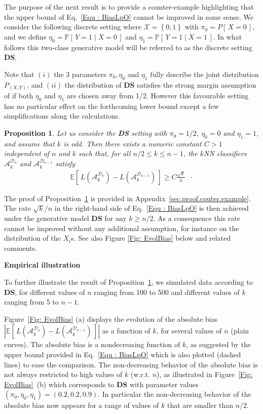 \documentclass[twoside,11pt]{article}
\numberwithin{equation}{section}
\newtheorem{prop}{Proposition}[section]
\newcommand{\1}{\mathds{1}}%
\newcommand{\paren}[1]{\left( #1 \right)}
\newcommand{\croch}[1]{\left[\, #1 \,\right]}
\newcommand{\acc}[1]{\left\{ #1 \right\}}
\newcommand{\E}{\mathbb{E}}
\renewcommand{\P}{\mathbb{P}}
\newcommand{\D}{\mathcal{D}}
\newcommand{\Dn}{\mathcal{D}_n}
\newcommand{\A}{\mathcal{A}}
\numberwithin{equation}{section}
\theoremstyle{plain}
\begin{document}
The purpose of the next result is to provide a counter-example highlighting that the upper bound of Eq.~\eqref{Equ : BiasLpO} cannot be improved in some sense. We consider the following discrete setting where $\mathcal{X}=\acc{0,1}$ with $\pi_0 = P\croch{X=0}$, and we define $\eta_0 = \P\croch{ Y=1 \mid X=0}$ and $\eta_1 = \P\croch{ Y=1 \mid X=1}$. In what follows this two-class generative model will be referred to as the discrete setting \textbf{DS}.

Note that $(i)$ the 3 parameters $\pi_0, \eta_0$ and $\eta_1$ fully describe the joint distribution $P_{(X,Y)}$, and $(ii)$ the distribution of \textbf{DS} satisfies the strong margin assumption of \cite{MassNedelec_2006} if both $\eta_0$ and $\eta_1$ are chosen away from 1/2. However this favourable setting has no particular effect on the forthcoming lower bound except a few simplifications along the calculations.


\begin{prop}\label{res.counter.example.bias}
Let us consider the \textbf{DS} setting with $\pi_0 = 1/2$, $\eta_0 = 0$ and $\eta_1 = 1$, and assume that $k$ is odd.
Then there exists a numeric constant $C>1$ independent of $n$ and $k$ such that, for all $n/2 \leq k \leq n-1$, the $k$NN classifiers $\A_k^{\Dn}$ and $\A_k^{\D_{n-1}}$ satisfy
\begin{align*}
\E\croch{ L\paren{\A_k^{\Dn}} - L\paren{\A_k^{\D_{n-1}}}  } \geq C \frac{\sqrt{k}}{n} \enspace\cdot
\end{align*}
\end{prop}
%
The proof of Proposition~\ref{res.counter.example.bias} is provided in Appendix~\ref{sec.proof.couter.example}.
%
The rate $\sqrt{k}/n$ in the right-hand side of Eq.~\eqref{Equ : BiasLpO} is then achieved under the generative model \textbf{DS} for any $k\geq n/2$.
%
As a consequence this rate cannot be improved without any additional assumption, for instance on the distribution of the $X_i$s.
%
See also Figure \ref{Fig: EvolBias} below and related comments.


\noindent\textbf{Empirical illustration}

To further illustrate the result of Proposition~\ref{res.counter.example.bias}, we simulated data according to \textbf{DS}, for different values of $n$ ranging from 100 to 500 and different values of $k$ ranging from 5 to $n-1$.

Figure~\ref{Fig: EvolBias} (a) displays the evolution of the absolute bias $\left|\E\croch{ L\paren{\A_k^{\Dn}} - L\paren{\A_k^{\D_{n-1}}}  }\right|$ as a function of $k$, for several values of $n$ (plain curves).
%
The absolute bias is a nondecreasing function of $k$, as suggested by the upper bound provided in Eq.~\eqref{Equ : BiasLpO} which is also plotted (dashed lines) to ease the comparison.
%
The non-decreasing behavior of the absolute bias is not always restricted to high values of $k$ (w.r.t. $n$), as illustrated in Figure~\ref{Fig: EvolBias}~(b) which corresponds to \textbf{DS} with parameter values $(\pi_0,\eta_0,\eta_1)=(0.2,0.2,0.9)$. In particular the non-decreasing behavior of the absolute bias now appears for a range of values of $k$ that are smaller than $n/2$.
\end{document}
